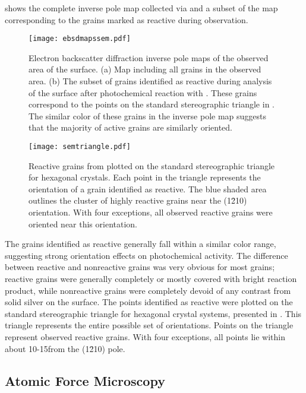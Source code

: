  shows the complete inverse pole map collected via  and a subset of the map corresponding to the grains marked as reactive during  observation.
\begin{figure}
	\texttt{[image: ebsdmapssem.pdf]} %
	\caption[Inverse pole maps of  surface]{%
		Electron backscatter diffraction inverse pole maps of the 
		observed area of the  surface. (a) Map including 
		all grains in the observed area. (b) The subset of grains 
		identified as reactive during  analysis of the surface 
		after photochemical reaction with . These grains 
		correspond to the points on the standard stereographic triangle 
		in . The similar color of these 
		grains in the inverse pole map suggests that the majority 
		of active grains are similarly oriented. }
\label{fig:ebsdmapsem}
\end{figure}
\begin{figure}
	\centerline{\texttt{[image: semtriangle.pdf]}}
		\caption[Reactive grains from ]{%
			Reactive grains from  plotted on 
			the standard stereographic triangle for hexagonal crystals. Each 
			point in the triangle represents the orientation of a grain 
			identified as reactive. The blue shaded area outlines the cluster 
			of highly reactive grains near the (1\={2}10) orientation. With 
			four exceptions, all observed reactive grains were oriented near 
			this orientation.}
	\label{fig:semtriangle}
\end{figure}
The grains identified as reactive generally fall within a similar color range, suggesting strong orientation effects on photochemical activity. The difference between reactive and nonreactive grains was very obvious for most grains; reactive grains were generally completely or mostly covered with bright reaction product, while nonreactive grains were completely devoid of any contrast from solid silver on the surface. The points identified as reactive were plotted on the standard stereographic triangle for hexagonal crystal systems, presented in . This triangle represents the entire possible set of orientations. Points on the triangle represent observed reactive grains. With four exceptions, all points lie within about 10-15\degree from the (1\={2}10) pole.


\subsection{Atomic Force Microscopy}
\label{subsec:ch9afm}


